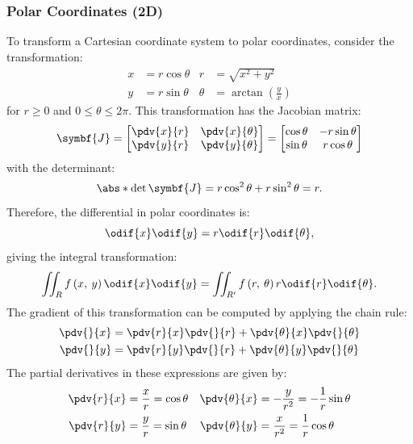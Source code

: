 \documentclass{article}
\begin{document}
\subsubsection{Polar Coordinates (2D)}
To transform a Cartesian coordinate system to polar coordinates,
consider the transformation:
\begin{align*}
    x & = r \cos{\theta} & r      & = \sqrt{x^2 + y^2}                    \\
    y & = r \sin{\theta} & \theta & = \arctan{\left( \frac{y}{x} \right)}
\end{align*}
for \(r \geqslant 0\) and \(0 \leqslant \theta \leqslant 2\pi\). This transformation has
the Jacobian matrix:
\begin{equation*}
    \symbf{J} =
    \begin{bmatrix}
        \displaystyle\pdv{x}{r} & \displaystyle\pdv{x}{\theta} \\
        \displaystyle\pdv{y}{r} & \displaystyle\pdv{y}{\theta}
    \end{bmatrix}
    =
    \begin{bmatrix}
        \cos{\theta} & -r \sin{\theta} \\
        \sin{\theta} & r \cos{\theta}
    \end{bmatrix}
\end{equation*}
with the determinant:
\begin{equation*}
    \abs*{\det{\symbf{J}}} = r \cos^2{\theta} + r \sin^2{\theta} = r.
\end{equation*}
Therefore, the differential in polar coordinates is:
\begin{equation*}
    \odif{x} \odif{y} = r \odif{r} \odif{\theta},
\end{equation*}
giving the integral transformation:
\begin{equation*}
    \iint_{R} f\left( x, \: y \right) \odif{x} \odif{y} = \iint_{R'} f\left( r, \: \theta \right) r \odif{r} \odif{\theta}.
\end{equation*}
The gradient of this transformation can be computed by applying the
chain rule:
\begin{align*}
    \pdv{}{x} & = \pdv{r}{x} \pdv{}{r} + \pdv{\theta}{x} \pdv{}{\theta} \\
    \pdv{}{y} & = \pdv{r}{y} \pdv{}{r} + \pdv{\theta}{y} \pdv{}{\theta}
\end{align*}
The partial derivatives in these expressions are given by:
\begin{align*}
    \pdv{r}{x} & = \frac{x}{r} = \cos{\theta} & \pdv{\theta}{x} & = -\frac{y}{r^2} = -\frac{1}{r}\sin{\theta} \\
    \pdv{r}{y} & = \frac{y}{r} = \sin{\theta} & \pdv{\theta}{y} & = \frac{x}{r^2} = \frac{1}{r}\cos{\theta}
\end{align*}
\end{document}
